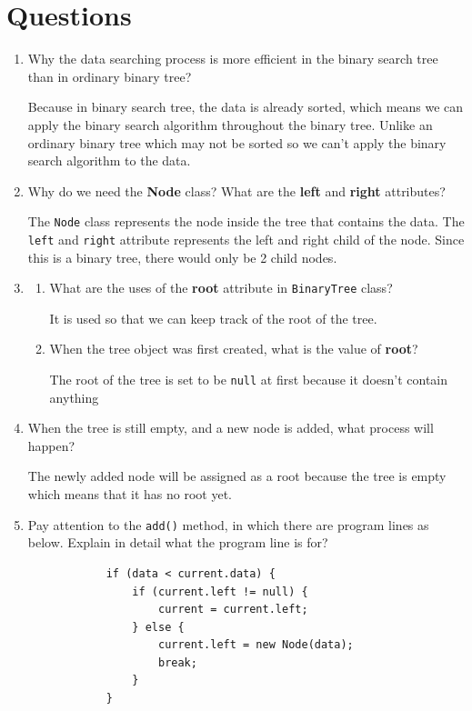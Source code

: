 \documentclass[12pt,titlepage]{article}
\begin{document}
\section{Questions}
\begin{enumerate}
    \item {
        Why the data searching process is more efficient in the binary search tree than in ordinary binary tree?

        Because in binary search tree, the data is already sorted, which means we can apply the binary search algorithm throughout the binary tree.
        Unlike an ordinary binary tree which may not be sorted so we can't apply the binary search algorithm to the data.
    }
    \item {
        Why do we need the \textbf{Node} class? What are the \textbf{left} and \textbf{right} attributes?

        The \texttt{Node} class represents the node inside the tree that contains the data.
        The \texttt{left} and \texttt{right} attribute represents the left and right child of the node. Since this is a binary tree,
        there would only be 2 child nodes.
    }
    \item {
        \begin{enumerate}[label=\alph*.)]
            \item {
                What are the uses of the \textbf{root} attribute in \texttt{BinaryTree} class?

                It is used so that we can keep track of the root of the tree.
            }
            \item {
                When the tree object was first created, what is the value of \textbf{root}?

                The root of the tree is set to be \texttt{null} at first because it doesn't contain anything
            }
        \end{enumerate}
    }
    \item {
        When the tree is still empty, and a new node is added, what process will happen?

        The newly added node will be assigned as a root because the tree is empty which means that it has no root yet.
    }
    \item {
        Pay attention to the \texttt{add()} method, in which there are program lines as below. 
        Explain in detail what the program line is for?

        \begin{verbatim}
            if (data < current.data) {
                if (current.left != null) {
                    current = current.left;
                } else {
                    current.left = new Node(data);
                    break;
                }
            }
        \end{verbatim}

}
\end{enumerate}
\end{document}

